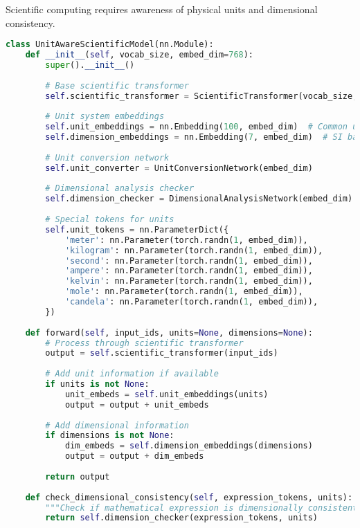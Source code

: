 Scientific computing requires awareness of physical units and dimensional consistency.

\begin{lstlisting}[language=Python, caption=Unit-aware scientific computing tokens]
class UnitAwareScientificModel(nn.Module):
    def __init__(self, vocab_size, embed_dim=768):
        super().__init__()
        
        # Base scientific transformer
        self.scientific_transformer = ScientificTransformer(vocab_size, embed_dim)
        
        # Unit system embeddings
        self.unit_embeddings = nn.Embedding(100, embed_dim)  # Common units
        self.dimension_embeddings = nn.Embedding(7, embed_dim)  # SI base dimensions
        
        # Unit conversion network
        self.unit_converter = UnitConversionNetwork(embed_dim)
        
        # Dimensional analysis checker
        self.dimension_checker = DimensionalAnalysisNetwork(embed_dim)
        
        # Special tokens for units
        self.unit_tokens = nn.ParameterDict({
            'meter': nn.Parameter(torch.randn(1, embed_dim)),
            'kilogram': nn.Parameter(torch.randn(1, embed_dim)),
            'second': nn.Parameter(torch.randn(1, embed_dim)),
            'ampere': nn.Parameter(torch.randn(1, embed_dim)),
            'kelvin': nn.Parameter(torch.randn(1, embed_dim)),
            'mole': nn.Parameter(torch.randn(1, embed_dim)),
            'candela': nn.Parameter(torch.randn(1, embed_dim)),
        })
        
    def forward(self, input_ids, units=None, dimensions=None):
        # Process through scientific transformer
        output = self.scientific_transformer(input_ids)
        
        # Add unit information if available
        if units is not None:
            unit_embeds = self.unit_embeddings(units)
            output = output + unit_embeds
        
        # Add dimensional information
        if dimensions is not None:
            dim_embeds = self.dimension_embeddings(dimensions)
            output = output + dim_embeds
        
        return output
    
    def check_dimensional_consistency(self, expression_tokens, units):
        """Check if mathematical expression is dimensionally consistent."""
        return self.dimension_checker(expression_tokens, units)
    

\end{lstlisting}
